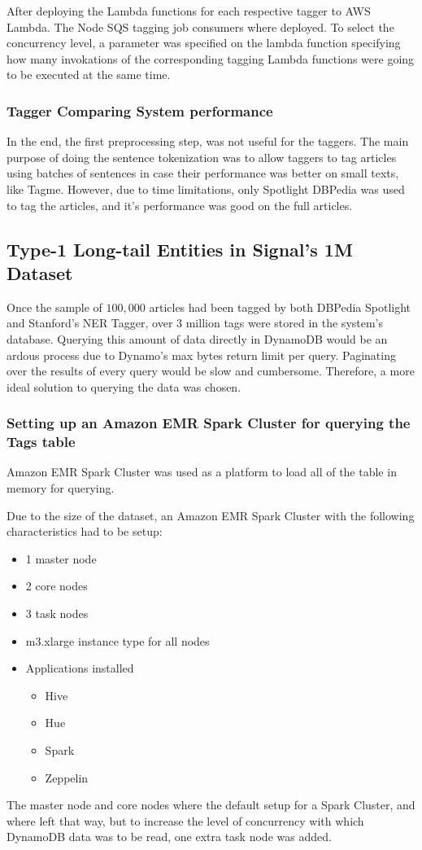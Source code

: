 After deploying the Lambda functions for each respective tagger to AWS Lambda.
The Node SQS tagging job consumers where deployed.
To select the concurrency level, a parameter was specified on the lambda function specifying how many invokations of the 
corresponding tagging Lambda functions were going to be executed at the same time.

\subsubsection{Tagger Comparing System performance}
In the end, the first preprocessing step, was not useful for the taggers.
The main purpose of doing the sentence tokenization was to allow taggers to tag articles using batches of sentences
in case their performance was better on small texts, like Tagme\cite{tagme}.
However, due to time limitations, only Spotlight DBPedia was used to tag the articles, and it's performance was good
on the full articles. 

\subsection{Type-1 Long-tail Entities in Signal's 1M Dataset} \label{ResultsSignal}
Once the sample of $100,000$ articles had been tagged by both DBPedia Spotlight and Stanford's NER Tagger,
over 3 million tags were stored in the system's database.
Querying this amount of data directly in DynamoDB would be an ardous process due to Dynamo's max bytes return limit per query.
Paginating over the results of every query would be slow and cumbersome.
Therefore, a more ideal solution to querying the data was chosen.

\subsubsection{Setting up an Amazon EMR Spark Cluster for querying the Tags table}
Amazon EMR Spark Cluster  was used as a platform to load all of the table in memory for querying.

Due to the size of the dataset, an Amazon EMR Spark Cluster with the following characteristics had to be setup:
\begin{itemize}
  \item 1 master node
  \item 2 core nodes
  \item 3 task nodes
  \item m3.xlarge instance type for all nodes
  \item Applications installed
    \begin{itemize}
      \item Hive
      \item Hue
      \item Spark
      \item Zeppelin
    \end{itemize}
\end{itemize}
The master node and core nodes where the default setup for a Spark Cluster, and where left that way,
but to increase the level of concurrency with which DynamoDB data was to be read, one extra task node was added.

